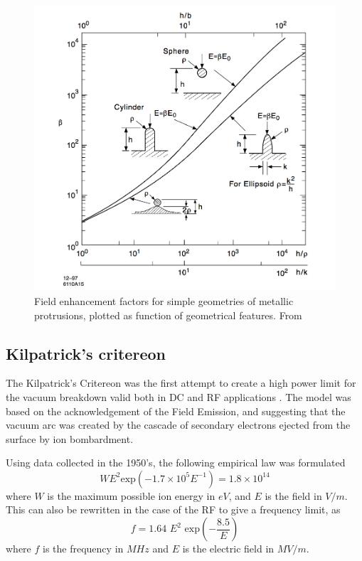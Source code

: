 \begin{figure}[h]
\centering

\includegraphics[scale=0.3]{pictures/beta_tip_val}
\caption{Field enhancement factors for simple geometries of metallic protrusions, plotted as function of geometrical features. From \cite{Rohrbach:190223}}
\label{tip_factors}

\end{figure}






\subsection[Kilpatrick's critereon]{Kilpatrick's critereon}

The Kilpatrick's Critereon was the first attempt to create a high power limit for the vacuum breakdown valid both in DC and RF applications \cite{KilpLimit}. The model was based on the acknowledgement of the Field Emission, and suggesting that the vacuum arc was created by the cascade of secondary electrons ejected from the surface by ion bombardment.

Using data collected in the 1950's, the following empirical law was formulated
\begin{equation}
W E^2 \text{exp} \left (  -1.7\times 10^5 E^{-1}  \right ) = 1.8 \times 10^{14}
\label{KilpLaw}
\end{equation}
where $W$ is the maximum possible ion energy in $eV$, and $E$ is the field in $V/m$. This can also be rewritten in the case of the RF to give a frequency limit, as
\begin{equation}
f = 1.64 \,\, E^2 \,\, \text{exp} \left (  -\frac{8.5}{E} \right )
\end{equation}
where $f$ is the frequency in $MHz$ and $E$ is the electric field in $MV/m$.

